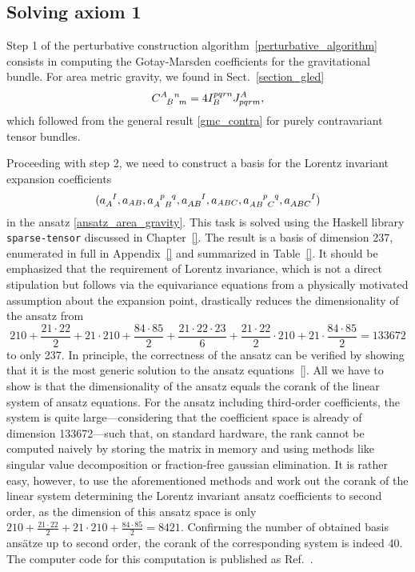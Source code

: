 \subsection{Solving axiom 1}\label{sect_area_lagrangian}
Step 1 of the perturbative construction algorithm~\ref{perturbative_algorithm} consists in computing the Gotay-Marsden coefficients for the gravitational bundle. For area metric gravity, we found in Sect.~\ref{section_gled}
\begin{equation}
  \gmc{A}{B}{n}{m} = 4 I^{pqrn}_B J^A_{pqrm},
\end{equation}
which followed from the general result \eqref{gmc_contra} for purely contravariant tensor bundles.

Proceeding with step 2, we need to construct a basis for the Lorentz invariant expansion coefficients
\begin{equation}
  (a_A^{\hphantom AI}, a_{AB}, a_{A\hphantom pB}^{\hphantom Ap\hphantom Bq}, a_{AB}^{\hphantom{AB}I}, a_{ABC}, a_{AB\hphantom pC}^{\hphantom{AB}p\hphantom Cq}, a_{ABC}^{\hphantom{ABC}I})
\end{equation}
in the ansatz \eqref{ansatz_area_gravity}. This task is solved using the Haskell library \texttt{sparse-tensor} \cite{Reinhart_2019_sparse-tensor} discussed in Chapter~\ref{}. The result is a basis of dimension 237, enumerated in full in Appendix~\ref{} and summarized in Table~\ref{}. It should be emphasized that the requirement of Lorentz invariance, which is not a direct stipulation but follows via the equivariance equations from a physically motivated assumption about the expansion point, drastically reduces the dimensionality of the ansatz from
\begin{equation}
  210 + \frac{21\cdot 22}{2} + 21\cdot 210 + \frac{84\cdot 85}{2} + \frac{21\cdot 22\cdot 23}{6} + \frac{21\cdot 22}{2} \cdot  210 + 21\cdot\frac{84\cdot 85}{2} = 133672
\end{equation}
to only 237. In principle, the correctness of the ansatz can be verified by showing that it is the most generic solution to the ansatz equations~\ref{}. All we have to show is that the dimensionality of the ansatz equals the corank of the linear system of ansatz equations. For the ansatz including third-order coefficients, the system is quite large---considering that the coefficient space is already of dimension 133672---such that, on standard hardware, the rank cannot be computed naively by storing the matrix in memory and using methods like singular value decomposition or fraction-free gaussian elimination. It is rather easy, however, to use the aforementioned methods and work out the corank of the linear system determining the Lorentz invariant ansatz coefficients to second order, as the dimension of this ansatz space is only $210 + \frac{21\cdot 22}{2} + 21 \cdot 210 + \frac{84\cdot 85}{2} = 8421$. Confirming the number of obtained basis ansätze up to second order, the corank of the corresponding system is indeed 40. The computer code for this computation is published as Ref.~\cite{Alex_2020_area-metric-gravity}.
